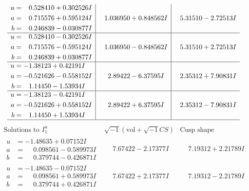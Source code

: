 \documentclass[1p]{elsarticle_modified}
\theoremstyle{definition}
\newcommand{\I}{\sqrt{-1}}
\begin{document}
$$\begin{array}{c|c|c}
\begin{aligned}
u &= \phantom{-}0.528410 + 0.302526 I \\
a &= \phantom{-}0.715576 + 0.595124 I \\
b &= \phantom{-}0.246839 - 0.030877 I\end{aligned}
 & \phantom{-}1.036950 + 0.848562 I & \phantom{-}5.31510 - 2.72513 I \\ \hline\begin{aligned}
u &= \phantom{-}0.528410 - 0.302526 I \\
a &= \phantom{-}0.715576 - 0.595124 I \\
b &= \phantom{-}0.246839 + 0.030877 I\end{aligned}
 & \phantom{-}1.036950 - 0.848562 I & \phantom{-}5.31510 + 2.72513 I \\ \hline\begin{aligned}
u &= -1.38123 + 0.42191 I \\
a &= -0.521626 - 0.558152 I \\
b &= \phantom{-}1.14450 - 1.53934 I\end{aligned}
 & \phantom{-}2.89422 - 6.37595 I & \phantom{-}2.35312 + 7.90831 I \\ \hline\begin{aligned}
u &= -1.38123 - 0.42191 I \\
a &= -0.521626 + 0.558152 I \\
b &= \phantom{-}1.14450 + 1.53934 I\end{aligned}
 & \phantom{-}2.89422 + 6.37595 I & \phantom{-}2.35312 - 7.90831 I\\
 \hline 
 \end{array}$$\newpage$$\begin{array}{c|c|c}  
\text{Solutions to }I^u_{1}& \I (\text{vol} + \sqrt{-1}CS) & \text{Cusp shape}\\
 \hline 
\begin{aligned}
u &= -1.48635 + 0.07152 I \\
a &= \phantom{-}0.098561 - 0.589973 I \\
b &= \phantom{-}0.379744 - 0.426871 I\end{aligned}
 & \phantom{-}7.67422 - 2.17377 I & \phantom{-}7.19312 + 2.21789 I \\ \hline\begin{aligned}
u &= -1.48635 - 0.07152 I \\
a &= \phantom{-}0.098561 + 0.589973 I \\
b &= \phantom{-}0.379744 + 0.426871 I\end{aligned}
 & \phantom{-}7.67422 + 2.17377 I & \phantom{-}7.19312 - 2.21789 I \\ \hline\begin{aligned}

\end{aligned}
\end{array}$$
\end{document}
